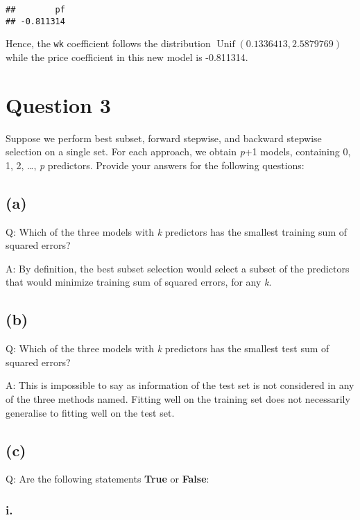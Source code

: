 \documentclass[
]{article}
\begin{document}
\begin{verbatim}
##        pf 
## -0.811314
\end{verbatim}

Hence, the \texttt{wk} coefficient follows the distribution
\(\operatorname{Unif}\left(0.1336413,2.5879769\right)\) while the price
coefficient in this new model is -0.811314.

\pagebreak

\hypertarget{question-3}{%
\section{Question 3}\label{question-3}}

Suppose we perform best subset, forward stepwise, and backward stepwise
selection on a single set. For each approach, we obtain \emph{p}+1
models, containing 0, 1, 2, \ldots, \emph{p} predictors. Provide your
answers for the following questions:

\hypertarget{a}{%
\subsection{(a)}\label{a}}

Q: Which of the three models with \emph{k} predictors has the smallest
training sum of squared errors?

A: By definition, the best subset selection would select a subset of the
predictors that would minimize training sum of squared errors, for any
\emph{k}.

\hypertarget{b-1}{%
\subsection{(b)}\label{b-1}}

Q: Which of the three models with \emph{k} predictors has the smallest
test sum of squared errors?

A: This is impossible to say as information of the test set is not
considered in any of the three methods named. Fitting well on the
training set does not necessarily generalise to fitting well on the test
set.

\hypertarget{c-1}{%
\subsection{(c)}\label{c-1}}

Q: Are the following statements \textbf{True} or \textbf{False}:

\hypertarget{i.-5}{%
\subsubsection{i.}\label{i.-5}}
\end{document}
